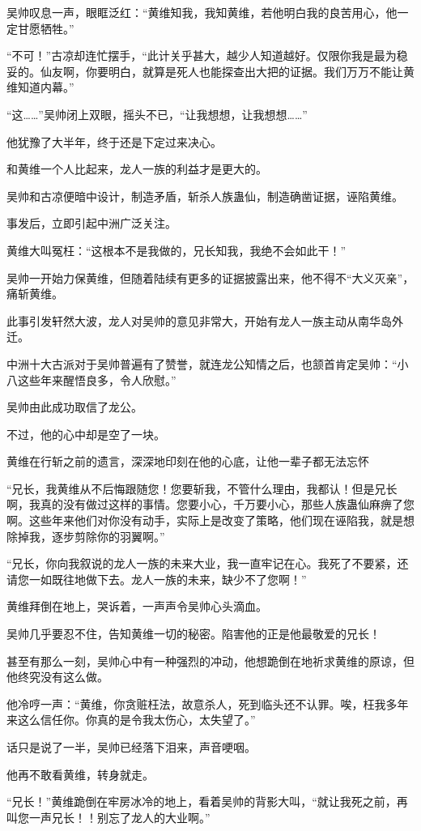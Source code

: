 \begin{this_body}
吴帅叹息一声，眼眶泛红：“黄维知我，我知黄维，若他明白我的良苦用心，他一定甘愿牺牲。”

“不可！”古凉却连忙摆手，“此计关乎甚大，越少人知道越好。仅限你我是最为稳妥的。仙友啊，你要明白，就算是死人也能探查出大把的证据。我们万万不能让黄维知道内幕。”

“这……”吴帅闭上双眼，摇头不已，“让我想想，让我想想……”

他犹豫了大半年，终于还是下定过来决心。

和黄维一个人比起来，龙人一族的利益才是更大的。

吴帅和古凉便暗中设计，制造矛盾，斩杀人族蛊仙，制造确凿证据，诬陷黄维。

事发后，立即引起中洲广泛关注。

黄维大叫冤枉：“这根本不是我做的，兄长知我，我绝不会如此干！”

吴帅一开始力保黄维，但随着陆续有更多的证据披露出来，他不得不“大义灭亲”，痛斩黄维。

此事引发轩然大波，龙人对吴帅的意见非常大，开始有龙人一族主动从南华岛外迁。

中洲十大古派对于吴帅普遍有了赞誉，就连龙公知情之后，也颔首肯定吴帅：“小八这些年来醒悟良多，令人欣慰。”

吴帅由此成功取信了龙公。

不过，他的心中却是空了一块。

黄维在行斩之前的遗言，深深地印刻在他的心底，让他一辈子都无法忘怀

“兄长，我黄维从不后悔跟随您！您要斩我，不管什么理由，我都认！但是兄长啊，我真的没有做过这样的事情。您要小心，千万要小心，那些人族蛊仙麻痹了您啊。这些年来他们对你没有动手，实际上是改变了策略，他们现在诬陷我，就是想除掉我，逐步剪除你的羽翼啊。”

“兄长，你向我叙说的龙人一族的未来大业，我一直牢记在心。我死了不要紧，还请您一如既往地做下去。龙人一族的未来，缺少不了您啊！”

黄维拜倒在地上，哭诉着，一声声令吴帅心头滴血。

吴帅几乎要忍不住，告知黄维一切的秘密。陷害他的正是他最敬爱的兄长！

甚至有那么一刻，吴帅心中有一种强烈的冲动，他想跪倒在地祈求黄维的原谅，但他终究没有这么做。

他冷哼一声：“黄维，你贪赃枉法，故意杀人，死到临头还不认罪。唉，枉我多年来这么信任你。你真的是令我太伤心，太失望了。”

话只是说了一半，吴帅已经落下泪来，声音哽咽。

他再不敢看黄维，转身就走。

“兄长！”黄维跪倒在牢房冰冷的地上，看着吴帅的背影大叫，“就让我死之前，再叫您一声兄长！！别忘了龙人的大业啊。”


\end{this_body}
